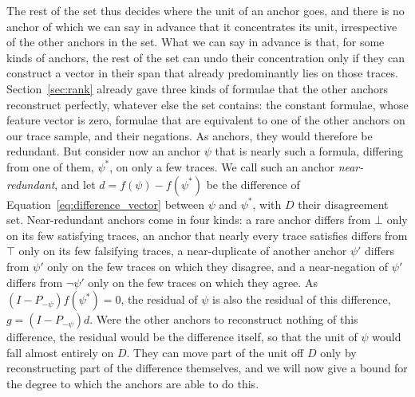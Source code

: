\documentclass[titlepage,a4paper,11pt]{report}
\begin{document}
    The rest of the set thus decides where the unit of an anchor goes, and there is no anchor of which we can say in advance that it concentrates its unit, irrespective of the other anchors in the set. What we can say in advance is that, for some kinds of anchors, the rest of the set can undo their concentration only if they can construct a vector in their span that already predominantly lies on those traces. Section~\ref{sec:rank} already gave three kinds of formulae that the other anchors reconstruct perfectly, whatever else the set contains: the constant formulae, whose feature vector is zero, formulae that are equivalent to one of the other anchors on our trace sample, and their negations. As anchors, they would therefore be redundant. But consider now an anchor $\psi$ that is nearly such a formula, differing from one of them, $\psi^\ast$, on only a few traces. We call such an anchor \emph{near-redundant}, and let $d=f(\psi)-f(\psi^\ast)$ be the difference of Equation~\eqref{eq:difference_vector} between $\psi$ and $\psi^\ast$, with $D$ their disagreement set. Near-redundant anchors come in four kinds: a rare anchor differs from $\bot$ only on its few satisfying traces, an anchor that nearly every trace satisfies differs from $\top$ only on its few falsifying traces, a near-duplicate of another anchor $\psi'$ differs from $\psi'$ only on the few traces on which they disagree, and a near-negation of $\psi'$ differs from $\neg\psi'$ only on the few traces on which they agree. As $(I-P_{-\psi})f(\psi^\ast)=0$, the residual of $\psi$ is also the residual of this difference, $g=(I-P_{-\psi})d$. Were the other anchors to reconstruct nothing of this difference, the residual would be the difference itself, so that the unit of $\psi$ would fall almost entirely on $D$. They can move part of the unit off $D$ only by reconstructing part of the difference themselves, and we will now give a bound for the degree to which the anchors are able to do this. 
    
\end{document}
